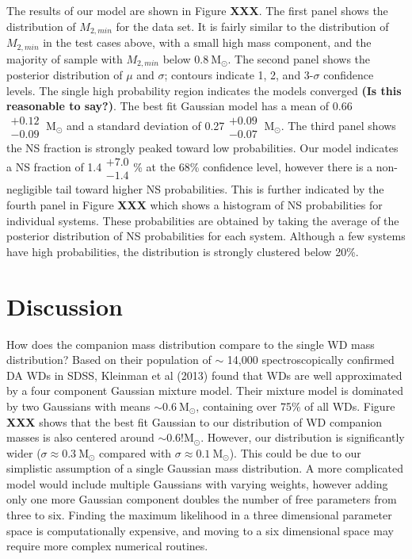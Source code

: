 \documentclass[letterpaper,12pt,preprint]{aastex}
\newcommand{\Msun}{\mathrm{M}_\odot}
\begin{document}
The results of our model are shown in Figure {\bf XXX}. The first panel shows the distribution of $M_{2,min}$ for the data set. It is fairly similar to the distribution of $M_{2,min}$ in the test cases above, with a small high mass component, and the majority of sample with $M_{2,min}$ below $0.8~\Msun$. The second panel shows the posterior distribution of $\mu$ and $\sigma$; contours indicate 1, 2, and 3-$\sigma$ confidence levels. The single high probability region indicates the models converged {\bf (Is this reasonable to say?)}. The best fit Gaussian model has a mean of 0.66 $\substack{+0.12 \\ -0.09}~\Msun$ and a standard deviation of 0.27$\substack{+0.09 \\ -0.07}~\Msun$. The third panel shows the NS fraction is strongly peaked toward low probabilities. Our model indicates a NS fraction of 1.4$\substack{+7.0 \\ -1.4}$\% at the 68\% confidence level, however there is a non-negligible tail toward higher NS probabilities. This is further indicated by the fourth panel in Figure {\bf XXX} which shows a histogram of NS probabilities for individual systems. These probabilities are obtained by taking the average of the posterior distribution of NS probabilities for each system. Although a few systems have high probabilities, the distribution is strongly clustered below 20\%.



\section{Discussion}

How does the companion mass distribution compare to the single WD mass distribution? Based on their population of $\sim$ 14,000 spectroscopically confirmed DA WDs in SDSS, Kleinman et al (2013) found that WDs are well approximated by a four component Gaussian mixture model. Their mixture model is dominated by two Gaussians with means $\sim0.6~\Msun$, containing over 75\% of all WDs. Figure {\bf XXX} shows that the best fit Gaussian to our distribution of WD companion masses is also centered around $\sim0.6!\Msun$. However, our distribution is significantly wider ($\sigma \approx 0.3~\Msun$ compared with $\sigma \approx 0.1~\Msun$). This could be due to our simplistic assumption of a single Gaussian mass distribution. A more complicated model would include multiple Gaussians with varying weights, however adding only one more Gaussian component doubles the number of free parameters from three to six. Finding the maximum likelihood in a three dimensional parameter space is computationally expensive, and moving to a six dimensional space may require more complex numerical routines. 
\end{document}
